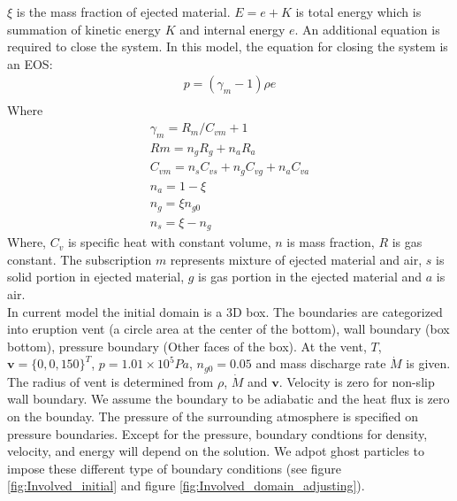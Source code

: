 \documentclass[10pt,a4paper]{article}
\begin{document}
$\xi$ is the mass fraction of ejected material.
$E = e + K $ is total energy which is summation of kinetic energy $K$ and internal energy $e$.
An additional equation is required to close the system. In this model, the equation for closing the system is an EOS:
\begin{align}
p = (\gamma_m - 1)\rho e \label{eq:EOS}\\
\end{align}
Where 
\begin{align}
\gamma_m = R_m/C_{vm} + 1 \label{eq:gov-gm}\\
Rm = n_gR_g + n_aR_a  \label{eq:gov-Rm}\\
C_{vm} = n_s C_{vs} + n_g C_{vg} + n_a C_{va} \label{eq:gov-Cvm}\\
n_a = 1 - \xi \label{eq:gov-na}\\
n_g = \xi n_{g0} \label{eq:gov-ng}\\
n_s = \xi - n_g \label{eq:gov-ns}
\end{align}
Where, $C_v$ is specific heat with constant volume, $n$ is mass fraction, $R$ is gas constant. The subscription $m$ represents mixture of ejected material and air, $s$ is solid portion in ejected material, $g$ is gas portion in the ejected material and $a$ is air.\\

In current model the initial domain is a 3D box. The boundaries are categorized into eruption vent (a circle area at the center of the bottom), wall boundary (box bottom), pressure boundary (Other faces of the box).
At the vent, $T$, $\textbf{v}=\{0,0,150\}^T$, $p=1.01\times10^5 Pa$, $n_{g0}=0.05$ and mass discharge rate $\dot M$ is given. The radius of vent is determined from $\rho$, $\dot M$ and $\textbf{v}$.
Velocity is zero for non-slip wall boundary. We assume the boundary to be adiabatic and the heat flux is zero on the bounday. The pressure of the surrounding atmosphere is specified on pressure boundaries. Except for the pressure, boundary condtions for density, velocity, and energy will depend on the solution. We adpot ghost particles to impose these different type of boundary conditions (see figure \ref{fig:Involved_initial} and figure \ref{fig:Involved_domain_adjusting}). 
\end{document}
